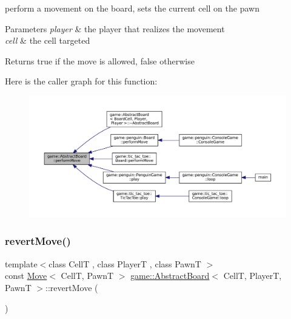 perform a movement on the board, sets the current cell on the pawn 


\begin{DoxyParams}{Parameters}
{\em player} & the player that realizes the movement \\
\hline
{\em cell} & the cell targeted\\
\hline
\end{DoxyParams}
\begin{DoxyReturn}{Returns}
true if the move is allowed, false otherwise 
\end{DoxyReturn}
Here is the caller graph for this function\+:
\nopagebreak
\begin{figure}[H]
\begin{center}
\leavevmode
\includegraphics[width=350pt]{classgame_1_1_abstract_board_ac2b6d96389ad0ac58d22323d75f91f97_icgraph}
\end{center}
\end{figure}
\mbox{\label{classgame_1_1_abstract_board_acc2d5fac68ec019e42fe166b727b7299}} 
\subsubsection{\texorpdfstring{revert\+Move()}{revertMove()}}
{\footnotesize\ttfamily template$<$class CellT , class PlayerT , class PawnT $>$ \\
const \hyperlink{structgame_1_1_move}{Move}$<$ CellT, PawnT $>$ \hyperlink{classgame_1_1_abstract_board}{game\+::\+Abstract\+Board}$<$ CellT, PlayerT, PawnT $>$\+::revert\+Move (\begin{DoxyParamCaption}{ }\end{DoxyParamCaption})\hspace{0.3cm}{\ttfamily [virtual]}}



